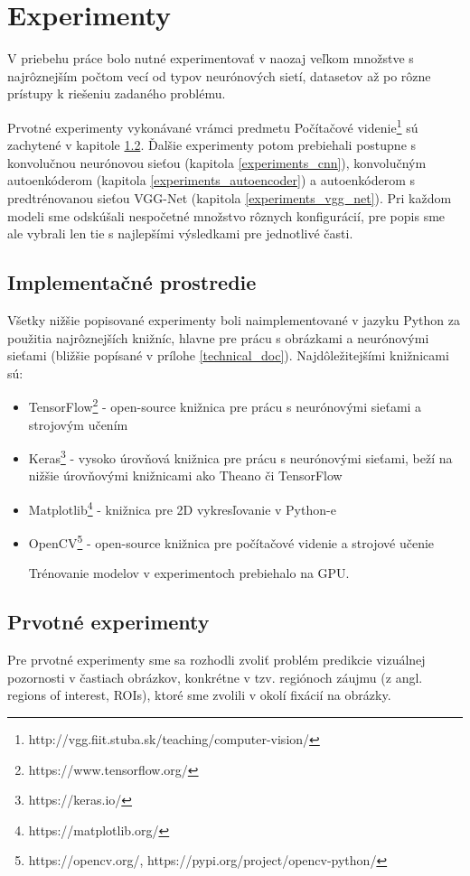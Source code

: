 \newpage
\null
\thispagestyle{empty}
\newpage
\section{Experimenty}
\label{experiments}
V priebehu práce bolo nutné experimentovať v naozaj veľkom množstve s najrôznejším počtom vecí od typov neurónových sietí, datasetov až po rôzne prístupy k riešeniu zadaného problému.

Prvotné experimenty vykonávané vrámci predmetu Počítačové videnie\footnote{http://vgg.fiit.stuba.sk/teaching/computer-vision/} sú zachytené v kapitole \ref{first_experiments}. Ďalšie experimenty potom prebiehali postupne s konvolučnou neurónovou sieťou (kapitola \ref{experiments_cnn}), konvolučným autoenkóderom (kapitola \ref{experiments_autoencoder}) a autoenkóderom s predtrénovanou sieťou VGG-Net (kapitola \ref{experiments_vgg_net}). Pri každom modeli sme odskúšali nespočetné množstvo rôznych konfigurácií, pre popis sme ale vybrali len tie s najlepšími výsledkami pre jednotlivé časti. 

\subsection{Implementačné prostredie}

Všetky nižšie popisované experimenty boli naimplementované v jazyku Python za použitia najrôznejších knižníc, hlavne pre prácu s obrázkami a neurónovými sieťami (bližšie popísané v prílohe \ref{technical_doc}). Najdôležitejšími knižnicami sú:
\begin{itemize}
	\item TensorFlow\footnote{https://www.tensorflow.org/} - open-source knižnica pre prácu s neurónovými sieťami a strojovým učením
	\item Keras\footnote{https://keras.io/} - vysoko úrovňová knižnica pre prácu s neurónovými sieťami, beží na nižšie úrovňovými knižnicami ako Theano či TensorFlow
	\item Matplotlib\footnote{https://matplotlib.org/} - knižnica pre 2D vykresľovanie v Python-e
	\item OpenCV\footnote{https://opencv.org/, https://pypi.org/project/opencv-python/} - open-source knižnica pre počítačové videnie a strojové učenie
	
	Trénovanie modelov v experimentoch prebiehalo na GPU.
\end{itemize}

\subsection{Prvotné experimenty}
\label{first_experiments}
Pre prvotné experimenty sme sa rozhodli zvoliť problém predikcie vizuálnej pozornosti v častiach obrázkov, konkrétne v tzv. regiónoch záujmu (z angl. regions of interest, ROIs), ktoré sme zvolili v okolí fixácií na obrázky.

